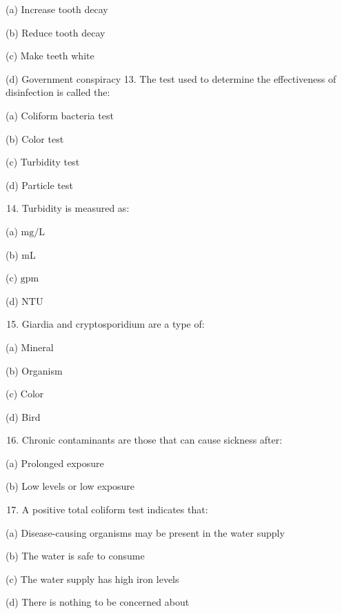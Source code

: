 \documentclass[10pt]{article}
\begin{document}
(a) Increase tooth decay

(b) Reduce tooth decay

(c) Make teeth white

(d) Government conspiracy 13. The test used to determine the effectiveness of disinfection is called the:

(a) Coliform bacteria test

(b) Color test

(c) Turbidity test

(d) Particle test

\begin{enumerate}
  \setcounter{enumi}{13}
  \item Turbidity is measured as:
\end{enumerate}

(a) $\mathrm{mg} / \mathrm{L}$

(b) $\mathrm{mL}$

(c) $\mathrm{gpm}$

(d) $\mathrm{NTU}$

\begin{enumerate}
  \setcounter{enumi}{14}
  \item Giardia and cryptosporidium are a type of:
\end{enumerate}

(a) Mineral

(b) Organism

(c) Color

(d) Bird

\begin{enumerate}
  \setcounter{enumi}{15}
  \item Chronic contaminants are those that can cause sickness after:
\end{enumerate}

(a) Prolonged exposure

(b) Low levels or low exposure

\begin{enumerate}
  \setcounter{enumi}{16}
  \item A positive total coliform test indicates that:
\end{enumerate}

(a) Disease-causing organisms may be present in the water supply

(b) The water is safe to consume

(c) The water supply has high iron levels

(d) There is nothing to be concerned about
\end{document}
